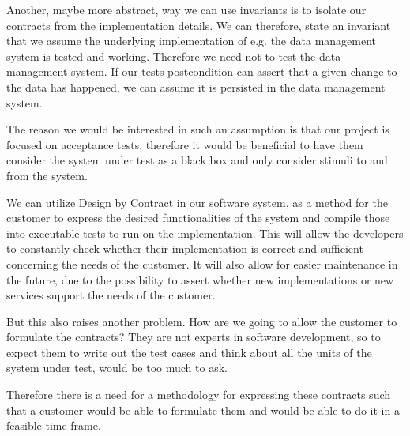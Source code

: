 Another, maybe more abstract, way we can use invariants is to isolate our contracts from the implementation details.
We can therefore, state an invariant that we assume the underlying implementation of e.g. the data management system is tested and working. 
Therefore we need not to test the data management system. If our tests postcondition can assert that a given change to the data has happened, we can assume it is persisted in the data management system.

The reason we would be interested in such an assumption is that our project is focused on acceptance tests, therefore it would be beneficial to have them consider the system under test as a black box and only consider stimuli to and from the system.

We can utilize Design by Contract in our software system, as a method for the customer to express the desired functionalities of the system and compile those into executable tests to run on the implementation. 
This will allow the developers to constantly check whether their implementation is correct and sufficient concerning the needs of the customer. 
It will also allow for easier maintenance in the future, due to the possibility to assert whether new implementations or new services support the needs of the customer.

But this also raises another problem. 
How are we going to allow the customer to formulate the contracts? 
They are not experts in software development, so to expect them to write out the test cases and think about all the units of the system under test, would be too much to ask.

Therefore there is a need for a methodology for expressing these contracts such that a customer would be able to formulate them and would be able to do it in a feasible time frame.
